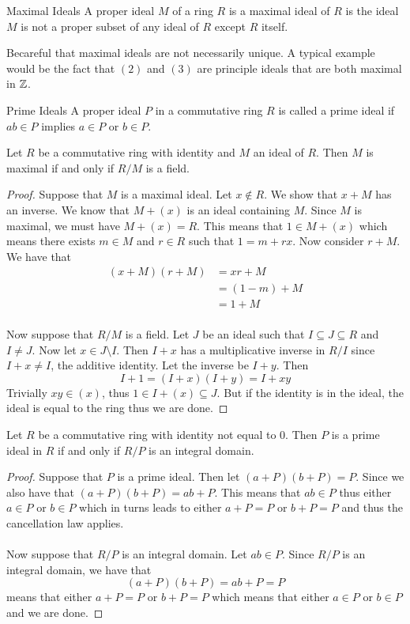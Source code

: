 \documentclass[a4paper]{article}
\begin{document}
\begin{defn}{Maximal Ideals}{} A proper ideal $M$ of a ring $R$ is a maximal ideal of $R$ is the ideal $M$ is not a proper subset of any ideal of $R$ except $R$ itself. 
\end{defn}

Becareful that maximal ideals are not necessarily unique. A typical example would be the fact that $(2)$ and $(3)$ are principle ideals that are both maximal in $\mathbb{Z}$. 

\begin{defn}{Prime Ideals}{} A proper ideal $P$ in a commutative ring $R$ is called a prime ideal if $ab\in P$ implies $a\in P$ or $b\in P$. 
\end{defn}

\begin{prp}{}{} Let $R$ be a commutative ring with identity and $M$ an ideal of $R$. Then $M$ is maximal if and only if $R/M$ is a field. \tcbline
\begin{proof}
Suppose that $M$ is a maximal ideal. Let $x\notin R$. We show that $x+M$ has an inverse. We know that $M+(x)$ is an ideal containing $M$. Since $M$ is maximal, we must have $M+(x)=R$. This means that $1\in M+(x)$ which means there exists $m\in M$ and $r\in R$ such that $1=m+rx$. Now consider $r+M$. We have that 
\begin{align*}
(x+M)(r+M)&=xr+M\\
&=(1-m)+M\\
&=1+M
\end{align*}~\\
Now suppose that $R/M$ is a field. Let $J$ be an ideal such that $I\subseteq J\subseteq R$ and $I\neq J$. Now let $x\in J\setminus I$. Then $I+x$ has a multiplicative inverse in $R/I$ since $I+x\neq I$, the additive identity. Let the inverse be $I+y$. Then $$I+1=(I+x)(I+y)=I+xy$$ Trivially $xy\in(x)$, thus $1\in I+(x)\subseteq J$. But if the identity is in the ideal, the ideal is equal to the ring thus we are done. 
\end{proof}
\end{prp}

\begin{prp}{}{} Let $R$ be a commutative ring with identity not equal to $0$. Then $P$ is a prime ideal in $R$ if and only if $R/P$ is an integral domain. \tcbline
\begin{proof}
Suppose that $P$ is a prime ideal. Then let $(a+P)(b+P)=P$. Since we also have that $(a+P)(b+P)=ab+P$. This means that $ab\in P$ thus either $a\in P$ or $b\in P$ which in turns leads to either $a+P=P$ or $b+P=P$ and thus the cancellation law applies. \\~\\
Now suppose that $R/P$ is an integral domain. Let $ab\in P$. Since $R/P$ is an integral domain, we have that $$(a+P)(b+P)=ab+P=P$$ means that either $a+P=P$ or $b+P=P$ which means that either $a\in P$ or $b\in P$ and we are done. 
\end{proof}
\end{prp}
\end{document}
